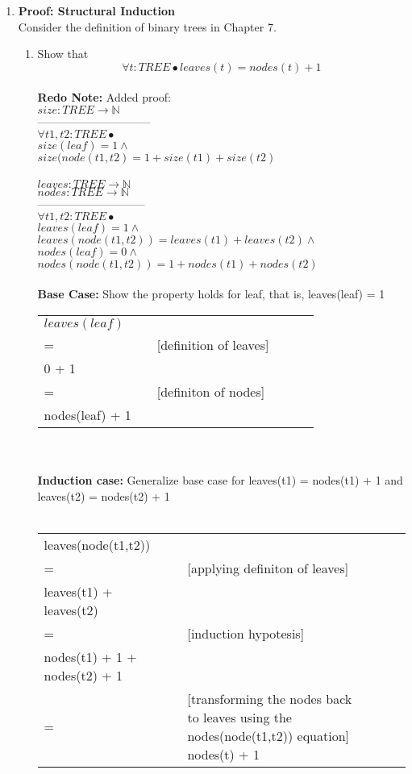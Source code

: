 \documentclass{article}
\begin{document}
\begin{enumerate}[\bf I.]
\item \textbf{Proof: Structural Induction} \\[8pt]
Consider the definition of binary trees in Chapter 7.
\begin{enumerate}
\item Show that
  \[\forall t: TREE \bullet leaves(t) = nodes(t) + 1\] \\
\textbf{Redo Note:} Added proof: \\
$ size: TREE \rightarrow \mathbb{N} $\\
------------------------------ \\
$ \forall t1,t2: TREE \bullet $\\
$ size (leaf) = 1 \land $\\
$ size (node(t1,t2) = 1 + size(t1) + size(t2) $ \\
\\
$leaves : TREE \rightarrow \mathbb{N}$ \\
$nodes: TREE \rightarrow \mathbb{N}$ \\
----------------------------- \\
$ \forall t1,t2: TREE \bullet $\\
$ leaves (leaf) = 1 \land $\\
$ leaves (node(t1,t2)) = leaves(t1) + leaves(t2) \land  $ \\
$ nodes(leaf) = 0 \land$\\
$ nodes(node(t1,t2)) = 1 + nodes(t1) + nodes(t2)$ \\
\\
\textbf{Base Case:} Show the property holds for leaf, that is, leaves(leaf) = 1 \\
\begin{tabular}{l ll lll}
  $leaves(leaf)$  &  &  \\
  =  & & [definition of leaves] \\
  0 + 1 & & \\
  = & & [definiton of nodes] \\
  nodes(leaf) + 1 & & \\
  
\end{tabular} \\
\\
\textbf{Induction case:} Generalize base case for leaves(t1) = nodes(t1) + 1 and leaves(t2) = nodes(t2) + 1  \\
\\
\begin{tabular}{l ll lll}
  leaves(node(t1,t2)) &  &  \\
  = & & [applying definiton of leaves] \\
  leaves(t1) + leaves(t2) & & \\
  = & & [induction hypotesis] \\
  nodes(t1) + 1 + nodes(t2) + 1 \\
  = & & [transforming the nodes back to leaves using the nodes(node(t1,t2)) equation]
  nodes(t) + 1 & & \\
\end{tabular} \\
\\



\end{enumerate}
\end{enumerate}
\end{document}
